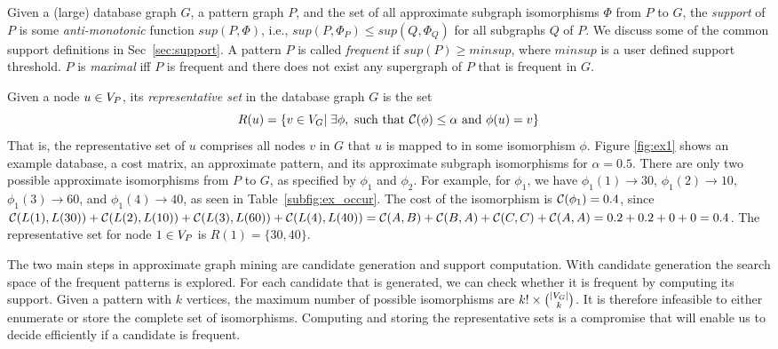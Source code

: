 \smallskip{} Given a (large) database graph
$G$, a pattern graph $P$, and the set of all approximate subgraph
isomorphisms $\Phi$ from $P$ to $G$, the {\em support} of $P$ is some
{\em anti-monotonic} function $sup(P,\Phi)$, i.e., $sup(P, \Phi_P) \le
sup(Q, \Phi_Q)$ for all subgraphs $Q$ of $P$. We discuss some of the
common support definitions in Sec~\ref{sec:support}.  A pattern $P$ is
called {\em frequent} if $sup(P) \geq minsup$, where $minsup$ is a user
defined support threshold.  $P$ is {\em maximal} iff $P$ is frequent and
there does not exist any supergraph of $P$ that is frequent in $G$.  


\smallskip{} Given a node $u \in V_P$,
its {\em representative set} in the database graph $G$ is the set $$R(u)
= \{ v \in V_G |\; \exists \phi, \text{ such that } \mathcal{C}(\phi) \le \alpha
\text{ and } \phi(u) = v \}$$ That is, the representative set of $u$
comprises all nodes $v$ in $G$ that $u$ is mapped to in some 
isomorphism $\phi$.  Figure \ref{fig:ex1} shows an example database, a
cost matrix, an approximate pattern, and its approximate subgraph
isomorphisms for $\alpha=0.5$.  There are only two possible approximate
isomorphisms from $P$ to $G$, as specified by $\phi_1$ and $\phi_2$. For
example, for $\phi_1$, we have $\phi_1(1) \to 30$, $\phi_1(2) \to 10$,
$\phi_1(3) \to 60$, and $\phi_1(4) \to 40$, as seen in
Table~\ref{subfig:ex_occur}.  The cost of the isomorphism is
$\mathcal{C}(\phi_1) = 0.4$, since $\mathcal{C}(L(1),L(30)) + \mathcal{C}(L(2),L(10)) +
\mathcal{C}(L(3),L(60)) + \mathcal{C}(L(4),L(40)) = \mathcal{C}(A,B) + \mathcal{C}(B,A) + \mathcal{C}(C,C)+
\mathcal{C}(A,A) = 0.2+0.2+0+0 = 0.4$.  The representative set for node $1 \in
V_P$ is $R(1) = \{30, 40\}$. 


\smallskip{} The two main steps in
approximate graph mining are candidate generation and support
computation. With candidate generation the search space of the frequent
patterns is explored. For each candidate that is generated, we can check
whether it is frequent by computing its support.  Given a pattern with
$k$ vertices, the maximum number of possible isomorphisms are $k! \times
{|\vg| \choose k}$.  It is therefore infeasible to either enumerate or
store the complete set of isomorphisms. Computing and storing the
representative sets is a compromise that will enable us to decide
efficiently if a candidate is frequent.

%
%

